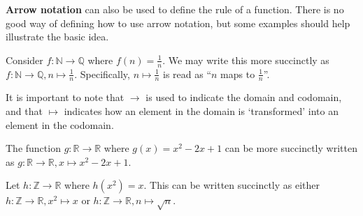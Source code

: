 \textbf{Arrow notation} can also be used to define the rule of a function. There is no good way of defining how to use arrow notation, but some examples should help illustrate the basic idea.
\begin{example}
    Consider $f: \mathbb{N} \to \mathbb{Q}$ where $f(n) = \frac1n$. We may write this more succinctly as $f: \mathbb{N} \to \mathbb{Q}, n \mapsto \frac1n$. Specifically, $n \mapsto \frac1n$ is read as ``$n$ maps to $\frac1n$''.
    
    It is important to note that $\to$ is used to indicate the domain and codomain, and that $\mapsto$ indicates how an element in the domain is `transformed' into an element in the codomain.
\end{example}
\begin{example}
    The function $g: \mathbb{R} \to \mathbb{R}$ where $g(x) = x^2 - 2x + 1$ can be more succinctly written as $g: \mathbb{R} \to \mathbb{R}, x \mapsto x^2 - 2x + 1$.
\end{example}
\begin{example}
    Let $h: \mathbb{Z} \to \mathbb{R}$ where $h(x^2) = x$. This can be written succinctly as either $h: \mathbb{Z} \to \mathbb{R}, x^2 \mapsto x$ or $h: \mathbb{Z} \to \mathbb{R}, n \mapsto \sqrt n$.
\end{example}

